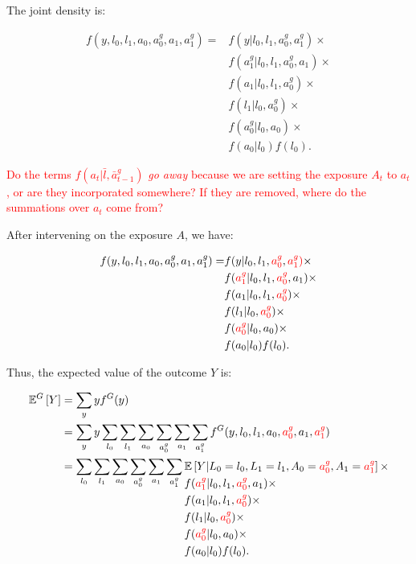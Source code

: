 \documentclass[12pt]{article}
\begin{document}
The joint density is:

\begin{align}
    f(y,l_0,l_1,a_0,a_0^g,a_1,a_1^g) = &f(y|l_0,l_1,a_0^g,a_1^g)\times\\
    &f(a_1^g|l_0,l_1,a_0^g,a_1)\times\\
    &f(a_1|l_0,l_1,a_0^g)\times\\
    &f(l_1|l_0,a_0^g)\times\\
    &f(a_0^g|l_0,a_0)\times\\
    &f(a_0|l_0) f(l_0).
\end{align}

\textcolor{red}{Do the terms $f(a_t|\bar{l},\bar{a}_{t-1}^g)$ \textit{go away} because we are setting the exposure $A_t$ to $a_t$, or are they incorporated somewhere? If they are removed, where do the summations over $a_t$ come from?}

After intervening on the exposure $A$, we have:

\begin{align}
    f(y,l_0,l_1,a_0,a_0^g,a_1,a_1^g) = &f(y|l_0,l_1,\textcolor{red}{a_0^g},\textcolor{red}{a_1^g)}\times\\
    &f(\textcolor{red}{a_1^g}|l_0,l_1,\textcolor{red}{a_0^g},a_1)\times\nonumber\\
    &f(a_1|l_0,l_1,\textcolor{red}{a_0^g})\times\nonumber\\
    &f(l_1|l_0,\textcolor{red}{a_0^g})\times\nonumber\\
    &f(\textcolor{red}{a_0^g}|l_0,a_0)\times\nonumber\\
    &f(a_0|l_0) f(l_0)\nonumber.
\end{align}

Thus, the expected value of the outcome $Y$ is:

\begin{align}
    \mathbb{E}^G \left[ Y \right] &= \sum_y y f^G(y) \\
    &= \sum_y y \sum_{l_0} \sum_{l_1} \sum_{a_0} \sum_{a_0^g} \sum_{a_1} \sum_{a_1^g} f^G(y,l_0,l_1,a_0,\textcolor{red}{a_0^g},a_1,\textcolor{red}{a_1^g}) \\
    &= \sum_{l_0} \sum_{l_1} \sum_{a_0} \sum_{a_0^g} \sum_{a_1} \sum_{a_1^g}
    \!\begin{aligned}[t]
        &\mathbb{E} \left[ Y|L_0=l_0,L_1=l_1,A_0=\textcolor{red}{a_0^g},A_1=\textcolor{red}{a_1^g}\right]\times\\
        &f(\textcolor{red}{a_1^g}|l_0,l_1,\textcolor{red}{a_0^g},a_1)\times\\
        &f(a_1|l_0,l_1,\textcolor{red}{a_0^g})\times\\
        &f(l_1|l_0,\textcolor{red}{a_0^g})\times\\
        &f(\textcolor{red}{a_0^g}|l_0,a_0)\times\\
        &f(a_0|l_0) f(l_0).
    \end{aligned}
\end{align}
\end{document}
